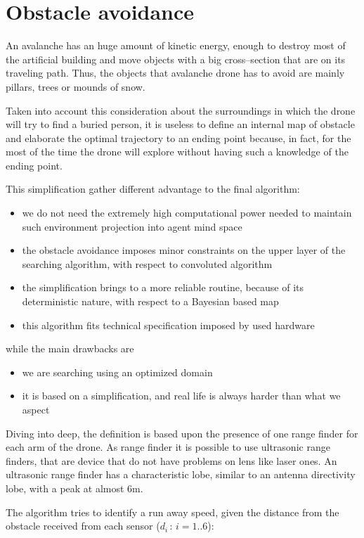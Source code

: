 
\section{Obstacle avoidance}
An avalanche has an huge amount of kinetic energy, enough to destroy most of the artificial building and move objects with a big cross--section that are on its traveling path. Thus, the objects that avalanche drone has to avoid are mainly pillars, trees or mounds of snow.

Taken into account this consideration about the surroundings in which the drone will try to find a buried person, it is useless to define an internal map of obstacle and elaborate the optimal trajectory to an ending point because, in fact, for the most of the time the drone will explore without having such a knowledge of the ending point.

This simplification gather different advantage to the final algorithm:
\begin{itemize}
\item we do not need the extremely high computational power needed to maintain such environment projection into agent mind space
\item the obstacle avoidance imposes minor constraints on the upper layer of the searching algorithm, with respect to convoluted algorithm
\item the simplification brings to a more reliable routine, because of its deterministic nature, with respect to a Bayesian based map
\item this algorithm fits technical specification imposed by used hardware
\end{itemize}
while the main drawbacks are
\begin{itemize}
\item we are searching using an optimized domain
\item it is based on a simplification, and real life is always harder than what we aspect
\end{itemize}

Diving into deep, the definition is based upon the presence of one range finder for each arm of the drone. As range finder it is possible to use ultrasonic range finders, that are device that do not have problems on lens like laser ones. An ultrasonic range finder has a characteristic lobe, similar to an antenna directivity lobe, with a peak at almost \num{6}\si{\meter}. 

The algorithm tries to identify a run away speed, given the distance from the obstacle received from each sensor (${d_i\,:\,i=1..6}$):

